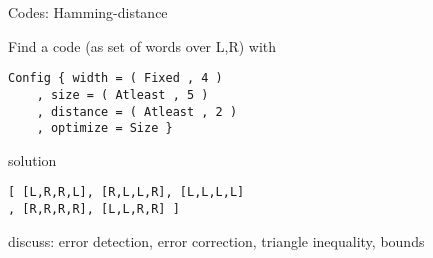 \begin{slide}{Codes: Hamming-distance}

Find a code (as set of words over L,R) with
\begin{verbatim}
Config { width = ( Fixed , 4 ) 
    , size = ( Atleast , 5 )
    , distance = ( Atleast , 2 ) 
    , optimize = Size }
\end{verbatim}
\bigskip
solution
\begin{verbatim}
[ [L,R,R,L], [R,L,L,R], [L,L,L,L]
, [R,R,R,R], [L,L,R,R] ]
\end{verbatim}
discuss: error detection, error correction,
triangle inequality, bounds

\end{slide}
